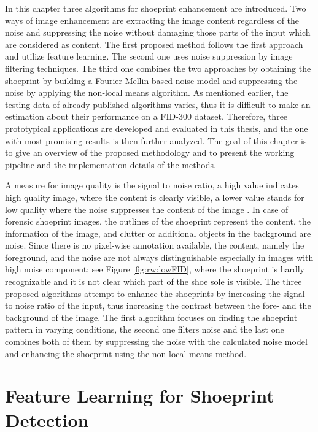 \documentclass[draft,final]{vutinfth} %
\begin{document}
\par
In this chapter three algorithms for shoeprint enhancement are introduced.
Two ways of image enhancement are extracting the image content regardless of the noise and suppressing the noise without damaging those parts of the input which are considered as content.
The first proposed method follows the first approach and utilize feature learning.
The second one uses noise suppression by image filtering techniques.
The third one combines the two approaches by obtaining the shoeprint by building  a Fourier-Mellin based noise model and suppressing the noise by applying the non-local means algorithm.
As mentioned earlier, the testing data of already published algorithms varies, thus it is difficult to make an estimation about their performance on a FID-300  \cite{kortylewski2014unsupervised} dataset.
Therefore, three prototypical applications are developed and evaluated in this thesis, and the one with most promising results is then further analyzed.
The goal of this chapter is to give an overview of the proposed methodology and to present the working pipeline and the implementation details of the methods.
\par
A measure for image quality is the signal to noise ratio, a high value indicates high quality image, where the content is clearly visible, a lower value stands for low quality where the noise suppresses the content of the image \cite{moubark2016clutter}.
In case of forensic shoeprint images, the outlines of the shoeprint represent the content, the information of the image, and clutter or additional objects in the background are noise. 
Since there is no pixel-wise annotation available, the content, namely the foreground, and the noise are not always distinguishable especially in images with high noise component; see Figure \ref{fig:rw:lowFID}, where the shoeprint is hardly recognizable and it is not clear which part of the shoe sole is visible.
The three proposed algorithms attempt to enhance the shoeprints by increasing the signal to noise ratio of the input, thus increasing the contrast between the fore- and the background of the image.
The first algorithm focuses on finding the shoeprint pattern in varying conditions, the second one filters noise and the last one combines both of them by suppressing the noise with the calculated noise model and enhancing the shoeprint using the non-local means method.

\section{Feature Learning for Shoeprint Detection}
\end{document}
